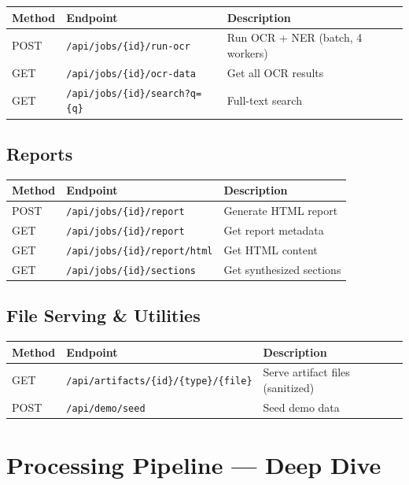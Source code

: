 \documentclass[12pt, a4paper]{article}
\newcommand{\codeinline}[1]{\texttt{\small\colorbox{codebg}{#1}}}
\begin{document}
\begin{tabularx}{\textwidth}{@{} l l X @{}}
    \toprule
    \textbf{Method} & \textbf{Endpoint} & \textbf{Description} \\
    \midrule
    POST & \codeinline{/api/jobs/\{id\}/run-ocr} & Run OCR + NER (batch, 4 workers) \\
    GET & \codeinline{/api/jobs/\{id\}/ocr-data} & Get all OCR results \\
    GET & \codeinline{/api/jobs/\{id\}/search?q=\{q\}} & Full-text search \\
    \bottomrule
\end{tabularx}

\subsection{Reports}

\begin{tabularx}{\textwidth}{@{} l l X @{}}
    \toprule
    \textbf{Method} & \textbf{Endpoint} & \textbf{Description} \\
    \midrule
    POST & \codeinline{/api/jobs/\{id\}/report} & Generate HTML report \\
    GET & \codeinline{/api/jobs/\{id\}/report} & Get report metadata \\
    GET & \codeinline{/api/jobs/\{id\}/report/html} & Get HTML content \\
    GET & \codeinline{/api/jobs/\{id\}/sections} & Get synthesized sections \\
    \bottomrule
\end{tabularx}

\subsection{File Serving \& Utilities}

\begin{tabularx}{\textwidth}{@{} l l X @{}}
    \toprule
    \textbf{Method} & \textbf{Endpoint} & \textbf{Description} \\
    \midrule
    GET & \codeinline{/api/artifacts/\{id\}/\{type\}/\{file\}} & Serve artifact files (sanitized) \\
    POST & \codeinline{/api/demo/seed} & Seed demo data \\
    \bottomrule
\end{tabularx}

\section{Processing Pipeline --- Deep Dive}
\end{document}
